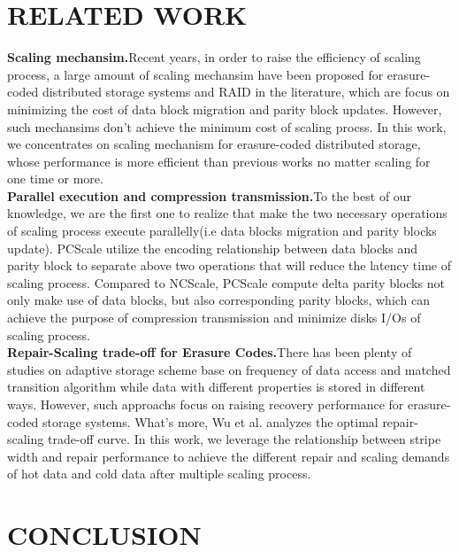 \setlength{\parindent}{0pt}
\section{RELATED WORK}

\textbf{Scaling mechansim.}Recent years, in order to raise the efficiency of 
scaling process, a large amount of scaling mechansim have been proposed for 
erasure-coded distributed storage systems and RAID in the literature, which 
are focus on minimizing the cost of data block  migration and parity block 
updates. However, such mechansims don't achieve the minimum cost of scaling 
procss. In this work, we concentrates on scaling mechanism for erasure-coded
distributed storage, whose performance is more efficient than previous works
no matter scaling for one time or more. \\
\textbf{Parallel execution and compression transmission.}To the best of our 
knowledge, we are the first one to realize that make the two necessary 
operations of scaling process execute parallelly(i.e data blocks migration 
and parity blocks update). PCScale utilize the encoding relationship 
between data blocks and parity block to separate above two operations that 
will reduce the latency time of scaling process. Compared to NCScale, 
PCScale compute delta parity blocks not only make use of data blocks, but 
also corresponding parity blocks, which can achieve the purpose of 
compression transmission and minimize disks I/Os of scaling process.  \\ 
\textbf{Repair-Scaling trade-off for Erasure Codes.}There has been plenty of
studies on adaptive storage scheme base on frequency of data access and 
matched transition algorithm while data with different properties is stored
in different ways. However, such approachs focus on raising recovery 
performance for erasure-coded storage systems. What's more, Wu et al. 
analyzes the optimal repair-scaling trade-off curve. In this work, we 
leverage the relationship between stripe width and repair performance to 
achieve the different repair and scaling demands of hot data and cold data
after multiple scaling process.

\section{CONCLUSION}
